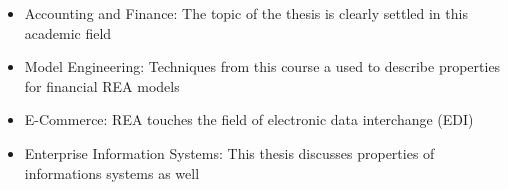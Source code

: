 \begin{itemize}
	\item Accounting and Finance: The topic of the thesis is clearly settled in this academic field
	\item Model Engineering: Techniques from this course a used to describe properties for financial REA models
	\item E-Commerce: REA touches the field of electronic data interchange (EDI) 
	\item Enterprise Information Systems: This thesis discusses properties of informations systems as well
\end{itemize}





